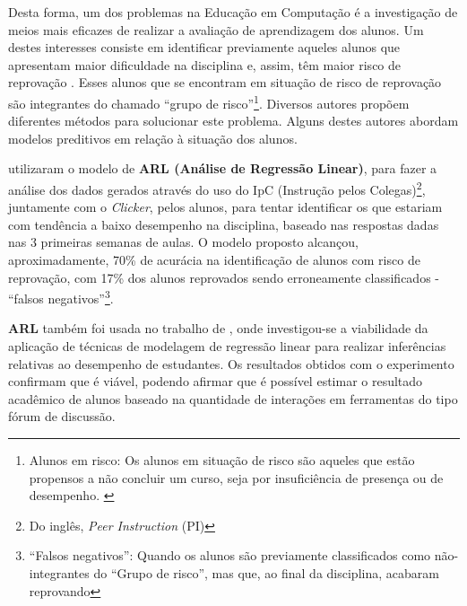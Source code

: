 \documentclass[
	12pt,				%
	openright,			%
	oneside,
	a4paper,			%
	english,			%
	french,				%
	spanish,			%
	brazil,				%
	]{abntex2}
\begin{document}
Desta forma, um dos problemas na Educação em Computação é a investigação de meios mais eficazes de realizar a avaliação de aprendizagem dos alunos. Um destes interesses consiste em identificar previamente aqueles alunos que apresentam maior dificuldade na disciplina e, assim, têm maior risco de reprovação \cite{martins2012assistente}. Esses alunos que se encontram em situação de risco de reprovação são integrantes do chamado ``grupo de risco''\footnote[1]{Alunos em risco: Os alunos em situação de risco são aqueles que estão propensos a não concluir um curso, seja por insuficiência de presença ou de desempenho. \cite{da2014alunos}}. Diversos autores propõem diferentes métodos para solucionar este problema. Alguns destes autores abordam modelos preditivos em relação à situação dos alunos.




 utilizaram o modelo de \textbf{ARL (Análise de Regressão Linear)}, para fazer a análise dos dados gerados através do uso do IpC (Instrução pelos Colegas)\footnote[2]{Do inglês, \textit{Peer Instruction} (PI)}, juntamente com o \textit{Clicker}, pelos alunos, para tentar identificar os que estariam com tendência a baixo desempenho na disciplina, baseado nas respostas dadas nas 3 primeiras semanas de aulas. O modelo proposto alcançou, aproximadamente, 70\% de acurácia na identificação de alunos com risco de reprovação, com 17\% dos alunos reprovados sendo erroneamente classificados - ``falsos negativos''\footnote[3]{``Falsos negativos'': Quando os alunos são previamente classificados como não-integrantes do ``Grupo de risco'', mas que, ao final da disciplina, acabaram reprovando}.

\textbf{ARL} também foi usada no trabalho de , onde investigou-se a viabilidade da aplicação de técnicas de modelagem de regressão linear para realizar inferências relativas ao desempenho de estudantes. Os resultados obtidos com o experimento confirmam que é viável, podendo afirmar que é possível estimar o resultado acadêmico de alunos baseado na quantidade de interações em ferramentas do tipo fórum de discussão. 
\end{document}
